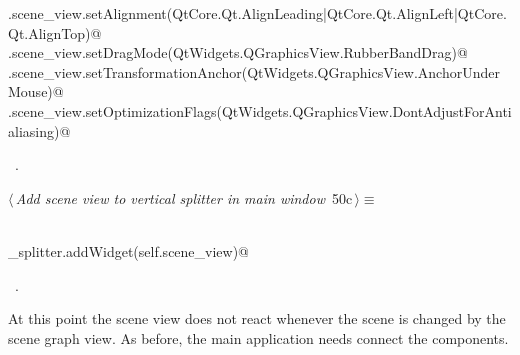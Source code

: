 \documentclass[
    a4paper,      %
    10pt,         %
    openright,    %
    notitlepage,  %
    parskip=half, %
]{scrreprt}       %
\theoremstyle{definition}                    %
\begin{document}
\begin{flushleft}
\begin{minipage}{\linewidth}
\begin{list}{}{}
\mbox{}\lstinline@self.scene_view.setAlignment(QtCore.Qt.AlignLeading|QtCore.Qt.AlignLeft|QtCore.Qt.AlignTop)@\\
\mbox{}\lstinline@self.scene_view.setDragMode(QtWidgets.QGraphicsView.RubberBandDrag)@\\
\mbox{}\lstinline@self.scene_view.setTransformationAnchor(QtWidgets.QGraphicsView.AnchorUnderMouse)@\\
\mbox{}\lstinline@self.scene_view.setOptimizationFlags(QtWidgets.QGraphicsView.DontAdjustForAntialiasing)@\\
\mbox{}\lstinline@@{\NWsep}
\end{list}
\vspace{-1.5ex}
\footnotesize
\begin{list}{}{\setlength{\itemsep}{-\parsep}\setlength{\itemindent}{-\leftmargin}}
\item \NWtxtMacroRefIn\ .

\item{}
\end{list}
\end{minipage}\vspace{4ex}
\end{flushleft}
\begin{flushleft} \small
\begin{minipage}{\linewidth}\label{scrap75}\raggedright\small
{} $\langle\,${\itshape Add scene view to vertical splitter in main window}\nobreak\ {\footnotesize {50c}}$\,\rangle\equiv$
\vspace{-1ex}
\begin{list}{}{} \item
\mbox{}\lstinline@@\\
\mbox{}\lstinline@vertical_splitter.addWidget(self.scene_view)@\\
\mbox{}\lstinline@@{\NWsep}
\end{list}
\vspace{-1.5ex}
\footnotesize
\begin{list}{}{\setlength{\itemsep}{-\parsep}\setlength{\itemindent}{-\leftmargin}}
\item \NWtxtMacroRefIn\ .

\item{}
\end{list}
\end{minipage}\vspace{4ex}
\end{flushleft}
At this point the scene view does not react whenever the scene is changed by the
scene graph view. As before, the main application needs connect the components.
\end{document}
